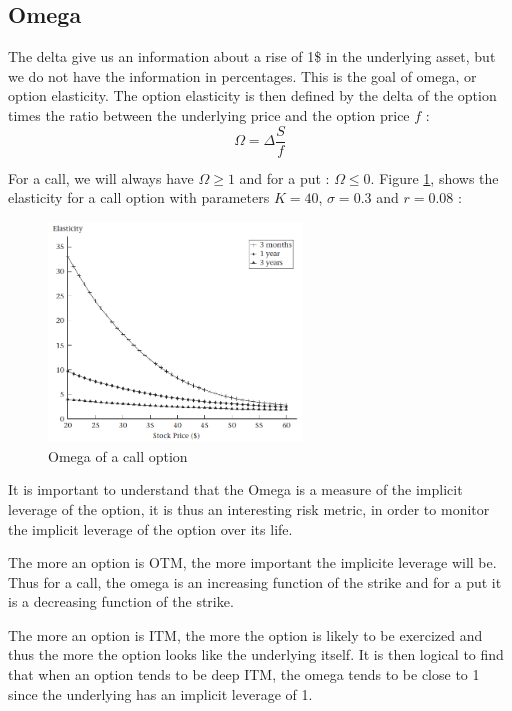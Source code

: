 \documentclass[hidelinks]{article}
\begin{document}
\newpage
\subsection{Omega}
The delta give us an information about a rise of 1\$ in the underlying asset, but we do not have the information in percentages. This is the goal of omega, or option elasticity. The option elasticity is then defined by the delta of the option times the ratio between the underlying price and the option price $f$ :
$$\Omega = \Delta \frac{S}{f} $$

For a call, we will always have $\Omega \geq 1$ and for a put : $\Omega \leq 0$. Figure \ref{fig:omega}, shows the elasticity for a call option with parameters $K=40$, $\sigma = 0.3$ and $r=0.08$ :

\begin{figure}[!h]
	\centering
	\includegraphics[width=0.6\textwidth]{omega.png}
    \caption{Omega of a call option}
    \label{fig:omega}
    \end{figure}
    
    It is important to understand that the Omega is a measure of the implicit leverage of the option, it is thus an interesting risk metric, in order to monitor the implicit leverage of the option over its life. 
    
    The more an option is OTM, the more important the implicite leverage will be. Thus for a call, the omega is an increasing function of the strike and for a put it is a decreasing function of the strike.
    
    The more an option is ITM, the more the option is likely to be exercized and thus the more the option looks like the underlying itself.  It is then logical to find that when an option tends to be deep ITM, the omega tends to be close to 1 since the underlying has an implicit leverage of 1.
    
\end{document}
